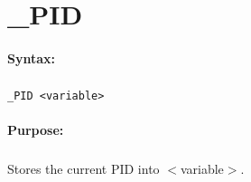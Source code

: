 
\newpage
\section{\_PID}
\label{cmd:_PID}

\paragraph{Syntax:}
\subparagraph{}
\texttt{\_PID <variable>}

\paragraph{Purpose:}
\subparagraph{}
Stores the current PID into $<$variable$>$.